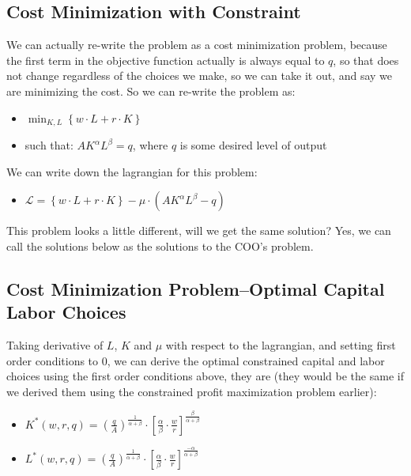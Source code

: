 \documentclass[
]{book}
\providecommand{\tightlist}{%
  \setlength{\itemsep}{0pt}\setlength{\parskip}{0pt}}
\begin{document}
\hypertarget{cost-minimization-with-constraint}{%
\subsection{Cost Minimization with Constraint}\label{cost-minimization-with-constraint}}

We can actually re-write the problem as a cost minimization problem,
because the first term in the objective function actually is always
equal to \(q\), so that does not change regardless of the choices we make,
so we can take it out, and say we are minimizing the cost. So we can
re-write the problem as:

\begin{itemize}
\item
  \(\displaystyle \min_{K,L} \left\lbrace w\cdot L+r\cdot K\right\rbrace\)
\item
  such that: \(AK^{\alpha } L^{\beta } =q\), where \(q\) is some desired
  level of output
\end{itemize}

We can write down the lagrangian for this problem:

\begin{itemize}
\tightlist
\item
  \(\displaystyle \mathcal{L}=\left\lbrace w\cdot L+r\cdot K\right\rbrace -\mu \cdot (AK^{\alpha } L^{\beta } -q)\)
\end{itemize}

This problem looks a little different, will we get the same solution?
Yes, we can call the solutions below as the solutions to the COO's
problem.

\hypertarget{cost-minimization-problemoptimal-capital-labor-choices}{%
\subsection{Cost Minimization Problem--Optimal Capital Labor Choices}\label{cost-minimization-problemoptimal-capital-labor-choices}}

Taking derivative of \(L\), \(K\) and \(\mu\) with respect to the lagrangian,
and setting first order conditions to \(0\), we can derive the optimal
constrained capital and labor choices using the first order conditions
above, they are (they would be the same if we derived them using the
constrained profit maximization problem earlier):

\begin{itemize}
\item
  \(\displaystyle K^* (w,r,q)={\left(\frac{q}{A}\right)}^{\frac{1}{\alpha +\beta }} \cdot {\left\lbrack \frac{\alpha }{\beta }\cdot \frac{w}{r}\right\rbrack }^{\frac{\beta }{\alpha +\beta }}\)
\item
  \(\displaystyle L^* (w,r,q)={\left(\frac{q}{A}\right)}^{\frac{1}{\alpha +\beta }} \cdot {\left\lbrack \frac{\alpha }{\beta }\cdot \frac{w}{r}\right\rbrack }^{\frac{-\alpha }{\alpha +\beta }}\)
\end{itemize}
\end{document}
